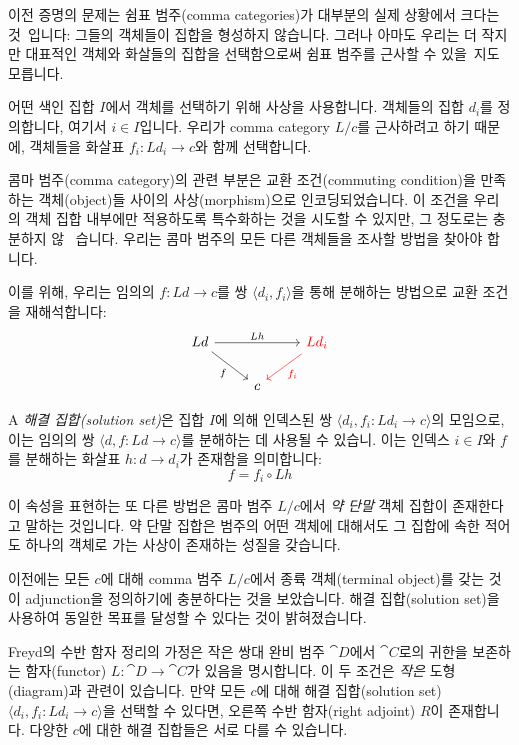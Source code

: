 \documentclass[DaoFP]{subfiles}
\begin{document}
이전 증명의 문제는 쉼표 범주(comma categories)가 대부분의 실제 상황에서 크다는 것~입니다: 그들의 객체들이 집합을 형성하지 않습니다. 그러나 아마도 우리는 더 작지만 대표적인 객체와 화살들의 집합을 선택함으로써 쉼표 범주를 근사할 수 있을~지도 모릅니다.

어떤 색인 집합 $I$에서 객체를 선택하기 위해 사상을 사용합니다. 객체들의 집합 $d_i$를 정의합니다, 여기서 $i \in I$입니다. 우리가 comma category $L/c$를 근사하려고 하기 때문에, 객체들을 화살표 $f_i \colon L d_i \to c$와 함께 선택합니다.

콤마 범주(comma category)의 관련 부분은 교환 조건(commuting condition)을 만족하는 객체(object)들 사이의 사상(morphism)으로 인코딩되었습니다. 이 조건을 우리의 객체 집합 내부에만 적용하도록 특수화하는 것을 시도할 수 있지만, 그 정도로는 충분하지 않 ~습니다. 우리는 콤마 범주의 모든 다른 객체들을 조사할 방법을 찾아야 합니다.

이를 위해, 우리는 임의의 $f \colon L d \to c$를 쌍 $\langle d_i, f_i \rangle$을 통해 분해하는 방법으로 교환 조건을 재해석합니다:
\[
 \begin{tikzcd}
 L d
 \arrow[rd, "f"']
 \arrow[rr, "L h"]
 && \textcolor{red}{L d_i}
 \arrow[ld, red, "f_i"]
 \\
 &c
  \end{tikzcd}
\]

A \emph{해결 집합(solution set)}은 집합 $I$에 의해 인덱스된 쌍 $\langle d_i, f_i \colon L d_i \to c \rangle $의 모임으로, 이는 임의의 쌍 $\langle d, f \colon L d \to c \rangle $를 분해하는 데 사용될 수 있습니. 이는 인덱스 $i \in I$와 $f$를 분해하는 화살표 $h \colon d \to d_i$가 존재함을 의미합니다:
\[ f = f_i \circ L h \]

이 속성을 표현하는 또 다른 방법은 콤마 범주 $L/c$에서 \emph{약 단말} 객체 집합이 존재한다고 말하는 것입니다. 약 단말 집합은 범주의 어떤 객체에 대해서도 그 집합에 속한 적어도 하나의 객체로 가는 사상이 존재하는 성질을 갖습니다.

이전에는 모든 $c$에 대해 comma 범주 $L/c$에서 종륙 객체(terminal object)를 갖는 것이 adjunction을 정의하기에 충분하다는 것을 보았습니다. 해결 집합(solution set)을 사용하여 동일한 목표를 달성할 수 있다는 것이 밝혀졌습니다.

Freyd의 수반 함자 정리의 가정은 작은 쌍대 완비 범주 $\cat D$에서 $\cat C$로의 귀한을 보존하는 함자(functor) $L \colon \cat D \to \cat C$가 있음을 명시합니다. 이 두 조건은 \emph{작은} 도형(diagram)과 관련이 있습니다. 만약 모든 $c$에 대해 해결 집합(solution set) $\langle d_i, f_i \colon L d_i \to c \rangle $을 선택할 수 있다면, 오른쪽 수반 함자(right adjoint) $R$이 존재합니다. 다양한 $c$에 대한 해결 집합들은 서로 다를 수 있습니다.
\end{document}
